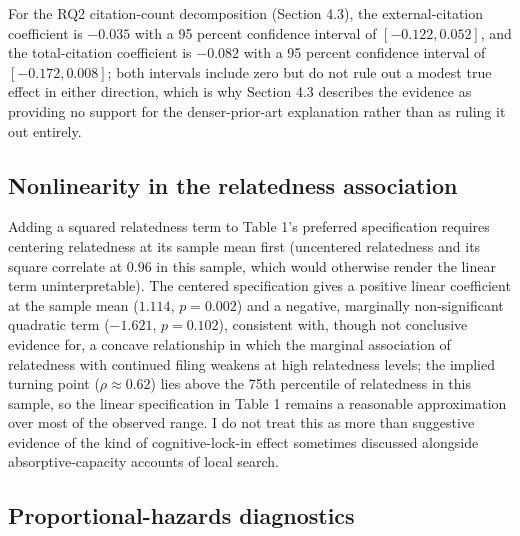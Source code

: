 \documentclass[12pt]{article}
\begin{document}
For the RQ2 citation-count decomposition (Section 4.3), the external-citation coefficient is $-0.035$ with a 95 percent confidence interval of $[-0.122, 0.052]$, and the total-citation coefficient is $-0.082$ with a 95 percent confidence interval of $[-0.172, 0.008]$; both intervals include zero but do not rule out a modest true effect in either direction, which is why Section 4.3 describes the evidence as providing no support for the denser-prior-art explanation rather than as ruling it out entirely.

\subsection{Nonlinearity in the relatedness association}

Adding a squared relatedness term to Table 1's preferred specification requires centering relatedness at its sample mean first (uncentered relatedness and its square correlate at $0.96$ in this sample, which would otherwise render the linear term uninterpretable). The centered specification gives a positive linear coefficient at the sample mean ($1.114$, $p=0.002$) and a negative, marginally non-significant quadratic term ($-1.621$, $p=0.102$), consistent with, though not conclusive evidence for, a concave relationship in which the marginal association of relatedness with continued filing weakens at high relatedness levels; the implied turning point ($\rho \approx 0.62$) lies above the 75th percentile of relatedness in this sample, so the linear specification in Table 1 remains a reasonable approximation over most of the observed range. I do not treat this as more than suggestive evidence of the kind of cognitive-lock-in effect sometimes discussed alongside absorptive-capacity accounts of local search.

\subsection{Proportional-hazards diagnostics}
\end{document}
